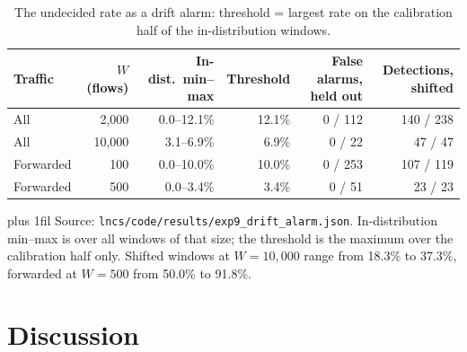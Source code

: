 \documentclass[runningheads]{llncs}
\newcommand{\tabnote}[1]{%
  \vspace{4pt}\par\noindent
  \begin{minipage}{\textwidth}%
    \footnotesize\parindent=0pt\leftskip=0pt\rightskip=0pt\parfillskip=0pt plus 1fil\relax
    #1%
  \end{minipage}}
\begin{document}
\begin{table}[htbp]
  \caption{The undecided rate as a drift alarm: threshold = largest rate on the calibration half of the in-distribution windows.}
  \label{tab:alarm}
  \centering
  \footnotesize
  \begin{tabular}{l r r r r r}
    \toprule
    Traffic & $W$ (flows) & In-dist.\ min--max & Threshold & False alarms, held out & Detections, shifted \\
    \midrule
    All      & 2{,}000  & 0.0--12.1\%  & 12.1\% & 0 / 112 & 140 / 238 \\
    All      & 10{,}000 & 3.1--6.9\%   & 6.9\%  & 0 / 22  & 47 / 47 \\
    Forwarded & 100     & 0.0--10.0\%  & 10.0\% & 0 / 253 & 107 / 119 \\
    Forwarded & 500     & 0.0--3.4\%   & 3.4\%  & 0 / 51  & 23 / 23 \\
    \bottomrule
  \end{tabular}
  \tabnote{Source: \texttt{lncs/code/results/exp9\_drift\_alarm.json}. In-distribution min--max is over all windows of that size; the threshold is the maximum over the calibration half only. Shifted windows at $W=10{,}000$ range from 18.3\% to 37.3\%, forwarded at $W=500$ from 50.0\% to 91.8\%.}
\end{table}

\section{Discussion}
\label{sec:discussion}
\end{document}
